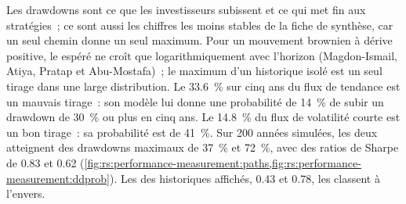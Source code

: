 Les drawdowns sont ce que les investisseurs subissent et ce qui met fin aux stratégies~; ce sont aussi les chiffres les moins stables de la fiche de synthèse, car un seul chemin donne un seul
maximum. Pour un mouvement brownien à dérive positive, le  espéré ne croît que logarithmiquement avec l'horizon (Magdon-Ismail, Atiya, Pratap et
Abu-Mostafa)~; le maximum d'un historique isolé est un seul tirage dans une large distribution. Le 33.6~\% sur cinq ans du flux de tendance est un mauvais tirage~: son modèle lui
donne une probabilité de 14~\% de subir un drawdown de 30~\% ou plus en cinq ans. Le 14.8~\% du flux de volatilité courte est un bon tirage~: sa probabilité est de 41~\%. Sur 200 années simulées, les deux atteignent des
drawdowns maximaux de 37~\% et 72~\%, avec des ratios de Sharpe de 0.83 et 0.62 (\cref{fig:rs:performance-measurement:paths,fig:rs:performance-measurement:ddprob}). Les 
des historiques affichés, 0.43 et 0.78, les classent à l'envers.

